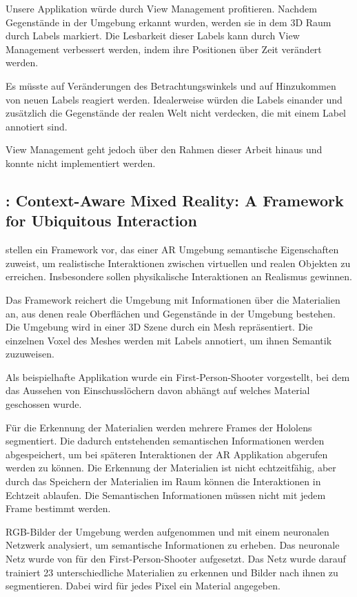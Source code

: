 Unsere Applikation würde durch View Management profitieren. Nachdem Gegenstände in der Umgebung erkannt wurden, werden sie in dem 3D Raum durch Labels markiert. Die Lesbarkeit dieser Labels kann durch View Management verbessert werden, indem ihre Positionen über Zeit verändert werden. 

Es müsste auf Veränderungen des Betrachtungswinkels und auf Hinzukommen von neuen Labels reagiert werden. Idealerweise würden die Labels einander und zusätzlich die Gegenstände der realen Welt nicht verdecken, die mit einem Label annotiert sind. 

View Management geht jedoch über den Rahmen dieser Arbeit hinaus und konnte nicht implementiert werden. \citep{viewmanagement3d}

\subsection{\cite{contextawaremixedreality}: Context-Aware Mixed Reality: A Framework for Ubiquitous Interaction}

\cite{contextawaremixedreality} stellen ein Framework vor, das einer AR Umgebung semantische Eigenschaften zuweist, um realistische Interaktionen zwischen virtuellen und realen Objekten zu erreichen. 
Insbesondere sollen physikalische Interaktionen an Realismus gewinnen.

Das Framework reichert die Umgebung mit Informationen über die Materialien an, aus denen reale Oberflächen und Gegenstände in der Umgebung bestehen. 
Die Umgebung wird in einer 3D Szene durch ein Mesh repräsentiert. Die einzelnen Voxel des Meshes werden mit Labels annotiert, um ihnen Semantik zuzuweisen.

Als beispielhafte Applikation wurde ein First-Person-Shooter vorgestellt, bei dem das Aussehen von Einschusslöchern davon abhängt auf welches Material geschossen wurde.

Für die Erkennung der Materialien werden mehrere Frames der Hololens segmentiert.
Die dadurch entstehenden semantischen Informationen werden abgespeichert, um bei späteren Interaktionen der AR Applikation abgerufen werden zu können. Die Erkennung der Materialien ist nicht echtzeitfähig, aber durch das Speichern der Materialien im Raum können die Interaktionen in Echtzeit ablaufen. Die Semantischen Informationen müssen nicht mit jedem Frame bestimmt werden.

RGB-Bilder der Umgebung werden aufgenommen und mit einem neuronalen Netzwerk analysiert, um semantische Informationen zu erheben. Das neuronale Netz wurde von \cite{contextawaremixedreality} für den First-Person-Shooter aufgesetzt. Das Netz wurde darauf trainiert 23 unterschiedliche Materialien zu erkennen und Bilder nach ihnen zu segmentieren. Dabei wird für jedes Pixel ein Material angegeben.

